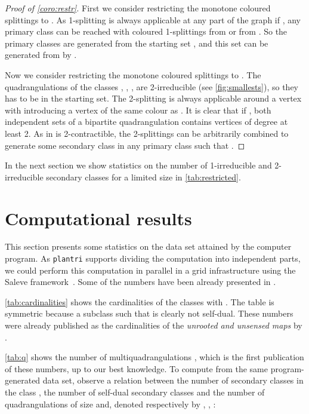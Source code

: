\documentclass[]{article}
\newcommand{\plantri}{{\tt plantri}\xspace}
\begin{document}
\begin{proof}[Proof of \autoref*{coro:restr}]
First we consider restricting the monotone coloured splittings to .
As 1-splitting is always applicable at any part of the graph if , any primary class can be reached with coloured 1-splittings from  or from .
So the primary classes are generated from the starting set , and this set can be generated from  by .


Now we consider restricting the monotone coloured splittings to .
The quadrangulations of the classes , , ,  are 2-irreducible (see \autoref{fig:smallests}), so they has to be in the starting set.
The 2-splitting is always applicable around a vertex  with  introducing a vertex  of the same colour as .
It is clear that if , both independent sets of a bipartite quadrangulation contains vertices of degree at least 2.
As  in  is 2-contractible, the 2-splittings can be arbitrarily combined to generate some secondary class in any primary class  such that .
\end{proof}

In the next section we show statistics on the number of 1-irreducible and 2-irreducible secondary classes for a limited size in \autoref{tab:restricted}.


\section{Computational results}
\label{sec:stats}

This section presents some statistics on the data set attained by the computer program.
As \plantri supports dividing the computation into independent parts, we could perform this computation in parallel in a grid infrastructure using the Saleve framework~\cite{Dobe2010}.
Some of the numbers have been already presented in \cite{Kapolnai2011}.

\autoref{tab:cardinalities} shows the cardinalities of the classes  with .
The table is symmetric because a subclass such that  is clearly not self-dual.
These numbers were already published as the cardinalities of the \emph{unrooted and unsensed maps} by \citet{Wormald1981, Walsh1983, Walsh2012}.

\autoref{tab:q} shows the number of multiquadrangulations , which is the first publication of these numbers, up to our best knowledge.
To compute  from the same program-generated data set, 
observe a relation between the number of secondary classes in the class , the number of self-dual secondary classes and the number of quadrangulations of size  and, denoted respectively by , , :
\end{document}
